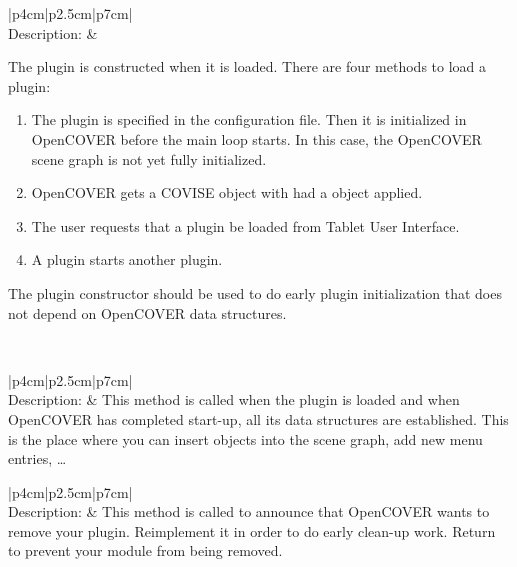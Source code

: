 \begin{longtable}{|p{4cm}|p{2.5cm}|p{7cm}|}
\hline
{}
{\bf {}}\\
\hline
{Description:}  
  & 
  {The plugin is constructed when it is loaded.
   There are four methods to load a plugin:
   \begin{enumerate}
   \item The plugin is specified in the configuration file.
      Then it is initialized in OpenCOVER before the main loop starts.
      In this case, the OpenCOVER scene graph is not yet fully initialized.
   \item OpenCOVER gets a COVISE object with had a  object applied.
   \item The user requests that a plugin be loaded from  Tablet User Interface.
   \item A plugin starts another plugin.
   \end{enumerate}
   The plugin constructor should be used to do early plugin initialization that does
   not depend on OpenCOVER data structures.
  } \\
\hline
\end{longtable}


\begin{longtable}{|p{4cm}|p{2.5cm}|p{7cm}|}
\hline
{}
{\bf {}}\\
\hline
{Description:}  
  & 
  {This method is called when the plugin is loaded and when OpenCOVER has
   completed start-up, all its data structures are established.
   This is the place where you can insert objects into the scene graph,
   add new menu entries, \ldots
  } \\
\hline
\end{longtable}


\begin{longtable}{|p{4cm}|p{2.5cm}|p{7cm}|}
\hline
{}
{\bf {}}\\
\hline
{Description:}  
  & 
  {This method is called to announce that OpenCOVER wants to remove your plugin.
   Reimplement it in order to do early clean-up work.
   Return  to prevent your module from being removed.
  } \\
\hline
\end{longtable}


